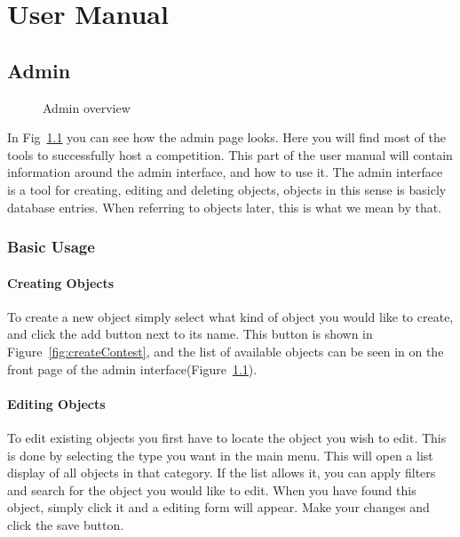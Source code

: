 \chapter{User Manual}

\section{Admin}
\begin{figure}
\centering
	\caption{Admin overview}
	\label{fig:adminOverview}
\end{figure}

In Fig~\ref{fig:adminOverview} you can see how the admin page looks. Here you will find
most of the tools to successfully host a competition. This part of the
user manual will contain information around the admin interface, and
how to use it. The admin interface is a tool for creating, editing and
deleting objects, objects in this sense is basicly database entries.
When referring to objects later, this is what we mean by that.


\subsection{Basic Usage}

\subsubsection{Creating Objects}

To create a new object simply select what kind of object you would like
to create, and click the add button next to its name. This button is
shown in Figure~\ref{fig:createContest}, and the list of available objects can be seen in
on the front page of the admin interface(Figure~\ref{fig:adminOverview}).

\subsubsection{Editing Objects}
\label{sec:editObjects}

To edit existing objects you first have to locate the object you wish to
edit. This is done by selecting the type you want in the main menu.
This will open a list display of all objects in that category. If the
list allows it, you can apply filters and search for the object you
would like to edit. When you have found this object, simply click it
and a editing form will appear. Make your changes and click the save
button.

